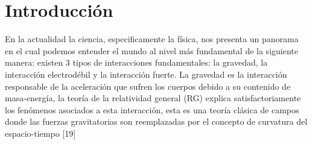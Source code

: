 \chapter{Introducción}
En la actualidad la ciencia, especificamente la física, nos presenta un panorama en el cual podemos entender el mundo al nivel más fundamental de la siguiente manera: existen 3 tipos de interacciones fundamentales: la gravedad, la interacción electrodébil y la interacción fuerte. La gravedad es la interacción responsable de la aceleración que sufren los cuerpos debido a su contenido de masa-energía, la teoría de la relatividad general (RG) explica satisfactoriamente los fenómenos asociados a esta interacción, esta es una teoría clásica de campos donde las fuerzas gravitatorias son reemplazadas por el concepto de curvatura del espacio-tiempo [19]